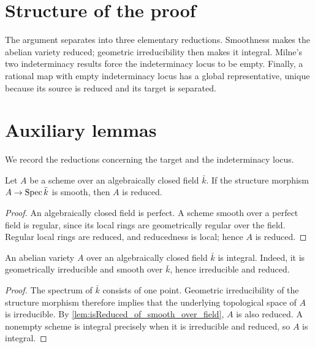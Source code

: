 \section{Structure of the proof}
\label{sec:thm32_lean_encoding}

The argument separates into three elementary reductions.  Smoothness makes
the abelian variety reduced; geometric irreducibility then makes it
integral.  Milne's two indeterminacy results force the indeterminacy locus to
be empty.  Finally, a rational map with empty indeterminacy locus has a
global representative, unique because its source is reduced and its target
is separated.

\section{Auxiliary lemmas}
\label{sec:thm32_lean_helpers}

We record the reductions concerning the target and the indeterminacy locus.

\begin{lemma}\leanok
  \label{lem:isReduced_of_smooth_over_field}
  Let \(A\) be a scheme over an algebraically closed field \(\bar k\).  If
  the structure morphism \(A\to\operatorname{Spec}\bar k\) is smooth, then \(A\) is
  reduced.
\end{lemma}
\begin{proof}
  An algebraically closed field is perfect.  A scheme smooth over a
  perfect field is regular, since its local rings are geometrically
  regular over the field.  Regular local rings are reduced, and
  reducedness is local; hence \(A\) is reduced.
\end{proof}

\begin{lemma}\leanok
  \label{lem:av_isIntegral_of_smooth_geomIrred}
  An abelian variety \(A\) over an algebraically closed field \(\bar k\) is
  integral.  Indeed, it is geometrically irreducible and smooth over
  \(\bar k\), hence irreducible and reduced.
\end{lemma}
\begin{proof}
  The spectrum of \(\bar k\) consists of one point.  Geometric
  irreducibility of the structure morphism therefore implies that the
  underlying topological space of \(A\) is irreducible.  By
  \cref{lem:isReduced_of_smooth_over_field}, \(A\) is also reduced.  A
  nonempty scheme is integral precisely when it is irreducible and
  reduced, so \(A\) is integral.
\end{proof}

